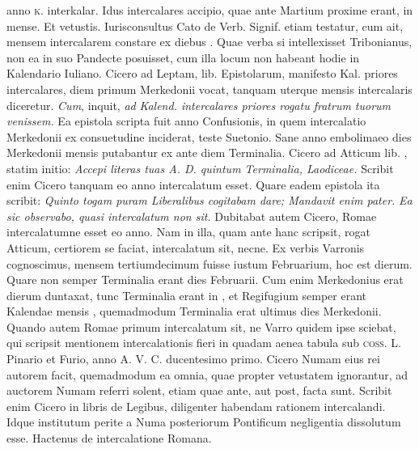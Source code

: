 anno  \textsc{k.} interkalar. %
Idus intercalares accipio, quae ante
Martium proxime erant, in  mense.
Et vetustis.
Iurisconsultus
Cato de Verb. Signif. etiam testatur, cum ait, mensem intercalarem %
constare ex diebus .
Quae verba si intellexisset Tribonianus,
non ea in suo Pandecte posuisset, cum illa locum non habeant
hodie in Kalendario Iuliano.
Cicero ad Leptam, lib.  Epistolarum, %
manifesto Kal. priores intercalares, diem primum Merkedonii %
vocat, tanquam uterque mensis intercalaris diceretur.
%
\textit{Cum}, inquit,
\textit{ad}  \textit{Kalend. %
 intercalares priores rogatu fratrum tuorum venissem.}
Ea epistola scripta fuit anno Confusionis,
 in quem intercalatio Merkedonii
ex consuetudine inciderat, teste Suetonio.
Sane anno embolimaeo
dies Merkedonii mensis putabantur ex ante diem Terminalia.
Cicero ad Atticum lib. , statim initio: %
 \textit{Accepi literas tuas
A. D. quintum Terminalia, Laodiceae.}
Scribit enim Cicero tanquam
eo anno intercalatum esset.
Quare eadem epistola ita scribit: \textit{Quinto
togam puram Liberalibus cogitabam dare; Mandavit enim pater.}
\textit{Ea sic observabo, quasi intercalatum non sit.}
Dubitabat autem Cicero,
Romae intercalatumne esset eo anno.
Nam in illa, quam ante
hanc scripsit, rogat Atticum, certiorem se faciat, intercalatum sit,
necne.
Ex verbis Varronis cognoscimus, mensem tertiumdecimum
fuisse iustum Februarium, hoc est  dierum.
Quare non semper
Terminalia erant dies  Februarii.
Cum enim Merkedonius erat
 dierum duntaxat, tunc Terminalia erant in , et Regifugium
semper erant Kalendae mensis , quemadmodum Terminalia erat
ultimus dies Merkedonii.
Quando autem Romae primum intercalatum
sit, ne Varro quidem ipse sciebat, qui scripsit mentionem intercalationis
fieri in quadam aenea tabula sub \textsc{coss}. L. Pinario et
Furio, anno A. V. C. ducentesimo primo.
Cicero Numam eius
rei autorem facit, quemadmodum ea omnia, quae propter vetustatem
ignorantur, ad auctorem Numam referri solent, etiam quae ante,
aut post, facta sunt.
Scribit enim Cicero in libris de Legibus, diligenter
habendam rationem intercalandi.
Idque institutum perite a
Numa posteriorum Pontificum negligentia dissolutum esse.
Hactenus
de intercalatione Romana.
